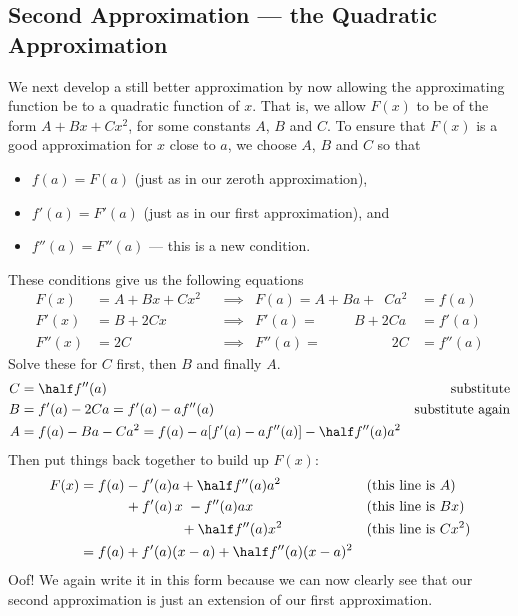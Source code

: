 \subsection{Second Approximation --- the Quadratic Approximation}
\label{ssec_second_approx}

We next develop a still better approximation by now allowing the
approximating function be to a quadratic function of $x$. That is,
we allow $F(x)$ to be of the form $A+Bx+Cx^2$, for some constants $A$, $B$
and $C$. To ensure that $F(x)$ is a good approximation for $x$ close
to $a$, we choose $A$, $B$ and $C$ so that
\begin{itemize}
  \item $f(a)=F(a)$  (just as in our zeroth approximation),
  \item $f'(a)=F'(a)$ (just as in our first approximation), and
  \item $f''(a)=F''(a)$ --- this is a new condition.
\end{itemize}
These conditions give us the following equations
\begin{align*}
F(x)&=A+Bx+Cx^2  & &\implies & F(a)=A+Ba+\phantom{2}Ca^2&=f(a)\\
F'(x)&=B+2Cx & &\implies & F'(a)=\phantom{A+a}B+2Ca&=f'(a)\\
F''(x)&=2C   & &\implies & F''(a)=\phantom{A+aB+a}2C&=f''(a)
\end{align*}
Solve these for $C$ first, then $B$ and finally $A$.
\begin{align*}
C &=\half f''(a) & \text{substitute}\\
B &= f'(a) - 2Ca = f'(a)-af''(a) & \text{substitute again}\\
A &= f(a)-Ba-Ca^2 = f(a)-a[f'(a)-af''(a)]-\half f''(a)a^2
\end{align*}
Then put things back together to build up $F(x)$:
\begin{align*}
F(x)&=f(a)-f'(a)a+\half f''(a)a^2 & &\text{(this line is $A$)}\cr
&\phantom{=f(a)\hskip3pt}+f'(a)\,x\hskip3pt- f''(a)ax
   & & \text{(this line is $Bx$)}\\
&\phantom{=f(a)-f'(a)a\hskip3.5pt}+\half f''(a)x^2
 & &\text{(this line is $Cx^2$)}\\
&=f(a)+f'(a)(x-a)+\half f''(a)(x-a)^2
\end{align*}
Oof! We again write it in this form because we can now clearly see that our second
approximation is just an extension of our first approximation.

